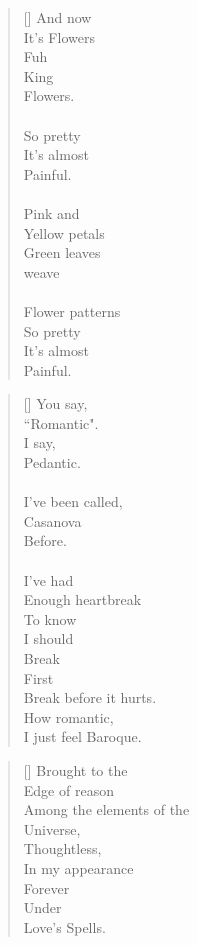\documentclass{article}
\begin{document}
\settowidth{\versewidth}{Than Tycho Brahe, or Erra Pater:}
\begin{verse}[\versewidth]
And now \\
It's Flowers \\
Fuh \\
King \\
Flowers. \\
\\
So pretty \\
It's almost \\
Painful. \\
\\
Pink and \\
Yellow petals \\
Green leaves \\
weave \\
\\
Flower patterns \\
So pretty \\
It's almost \\
Painful.
\\
\end{verse}

\settowidth{\versewidth}{Than Tycho Brahe, or Erra Pater:}
\begin{verse}[\versewidth]
You say, \\
``Romantic". \\

I say, \\
Pedantic. \\
\\
I've been called, \\
Casanova \\
Before. \\
\\
I've had \\
Enough heartbreak \\
To know \\
I should \\
Break \\
First \\
Break before it hurts. \\
How romantic, \\
I just feel Baroque. \\
\end{verse}

\newpage
{}
\settowidth{\versewidth}{Than Tycho Brahe, or Erra Pater:}
\begin{verse}[\versewidth]
Brought to the \\
Edge of reason \\
Among the elements of the \\
Universe, \\
Thoughtless, \\
In my appearance \\
Forever \\
Under \\
Love's Spells. \\
\end{verse}
\end{document}

